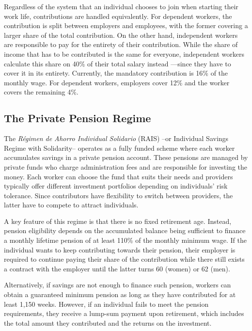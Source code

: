 \documentclass[12pt, a4paper]{article}
\begin{document}
Regardless of the system that an individual chooses to join when starting their work life, contributions are handled equivalently. For dependent workers, the contribution is split between employers and employees, with the former covering a larger share of the total contribution. On the other hand, independent workers are responsible to pay for the entirety of their contribution. While the share of income that has to be contributed is the same for everyone, independent workers calculate this share on 40\% of their total salary instead ---since they have to cover it in its entirety. Currently, the mandatory contribution is 16\% of the monthly wage. For dependent workers, employers cover 12\% and the worker covers the remaining 4\%.

\subsection{The Private Pension Regime}

The \textit{Régimen de Ahorro Individual Solidario} (RAIS) --or Individual Savings Regime with Solidarity-- operates as a fully funded scheme where each worker accumulates savings in a private pension account. These pensions are managed by private funds who charge administration fees and are responsible for investing the money. Each worker can choose the fund that suits their needs and providers typically offer different investment portfolios depending on individuals' risk tolerance. Since contributors have flexibility to switch between providers, the latter have to compete to attract individuals.

A key feature of this regime is that there is no fixed retirement age. Instead, pension eligibility depends on the accumulated balance being sufficient to finance a monthly lifetime pension of at least 110\% of the monthly minimum wage. If the individual wants to keep contributing towards their pension, their employer is required to continue paying their share of the contribution while there still exists a contract with the employer until the latter turns 60 (women) or 62 (men).

Alternatively, if savings are not enough to finance such pension, workers can obtain a guaranteed minimum pension as long as they have contributed for at least 1,150 weeks. However, if an individual fails to meet the pension requirements, they receive a lump-sum payment upon retirement, which includes the total amount they contributed and the returns on the investment. 
\end{document}
